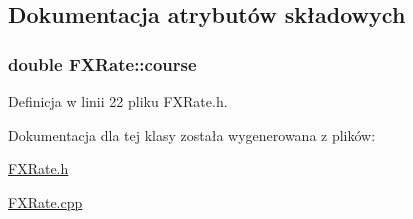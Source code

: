 \subsection{\-Dokumentacja atrybutów składowych}
\hypertarget{class_f_x_rate_aeb6f7d78d616eab824ddd67407056de1}{
\subsubsection[{course}]{\setlength{\rightskip}{0pt plus 5cm}double {\bf \-F\-X\-Rate\-::course}}}\label{class_f_x_rate_aeb6f7d78d616eab824ddd67407056de1}


\-Definicja w linii 22 pliku \-F\-X\-Rate.\-h.



\-Dokumentacja dla tej klasy została wygenerowana z plików\-:\begin{DoxyCompactItemize}
\item 
\hyperlink{_f_x_rate_8h}{\-F\-X\-Rate.\-h}\item 
\hyperlink{_f_x_rate_8cpp}{\-F\-X\-Rate.\-cpp}\end{DoxyCompactItemize}
